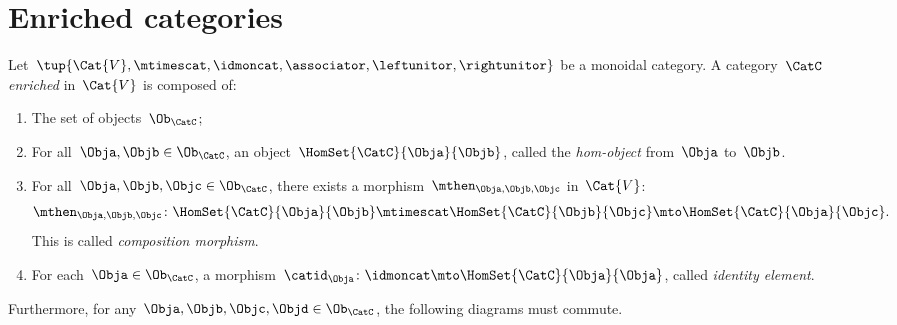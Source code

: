 
\section{Enriched categories}
\label{sec:enrichment-enriched-categories}

\begin{ctdefinition}
    \label{def:enriched_cat}
    Let~$\tup{\Cat{V},\mtimescat, \idmoncat, \associator, \leftunitor,\rightunitor}$ be a monoidal category.
    A category~$\CatC$ \emph{enriched} in~$\Cat{V}$ is composed of:
    \begin{enumerate}
        \item The set of objects~$\Ob_\CatC$;
        \item For all~$\Obja,\Objb\in \Ob_\CatC$, an object~$\HomSet{\CatC}{\Obja}{\Objb}$, called the \emph{hom-object} from~$\Obja$ to~$\Objb$.
        \item For all~$\Obja, \Objb, \Objc\in \Ob_\CatC$, there exists a morphism~$\mthen_{\Obja,\Objb,\Objc}$ in~$\Cat{V}$:
              \begin{equation}
                  \mthen_{\Obja,\Objb,\Objc}\colon \HomSet{\CatC}{\Obja}{\Objb}\mtimescat \HomSet{\CatC}{\Objb}{\Objc}\mto \HomSet{\CatC}{\Obja}{\Objc}.
              \end{equation}
              This is called \emph{composition morphism}.
        \item For each~$\Obja\in \Ob_\CatC$, a morphism~$\catid_\Obja\colon \idmoncat \mto \HomSet{\CatC}{\Obja}{\Obja}$, called \emph{identity element}.
    \end{enumerate}
    Furthermore, for any~$\Obja,\Objb,\Objc,\Objd\in \Ob_\CatC$, the following diagrams must commute.
\end{ctdefinition}

\begin{widepar}
    \begin{center}
    \end{center}

    \begin{center}
    \end{center}
\end{widepar}

